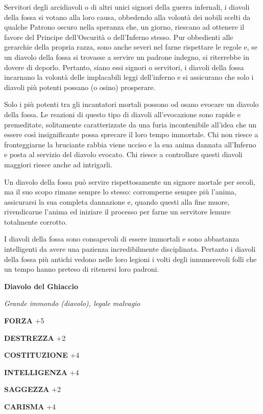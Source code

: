 \begin{multicols}{2}
	Servitori degli arcidiavoli o di altri unici signori della guerra infernali, i diavoli della fossa si votano alla loro causa, obbedendo alla volontà dei nobili scelti da qualche Patrono oscuro nella speranza che, un giorno, riescano ad ottenere il favore del Principe dell'Oscurità o dell'Inferno stesso. Pur obbedienti alle gerarchie della propria razza, sono anche severi nel farne rispettare le regole e, se un diavolo della fossa si trovasse a servire un padrone indegno, si riterrebbe in dovere di deporlo. Pertanto, siano essi signori o servitori, i diavoli della fossa incarnano la volontà delle implacabili leggi dell'inferno e si assicurano che solo i diavoli più potenti possano (o osino) prosperare.

	Solo i più potenti tra gli incantatori mortali possono od osano evocare un diavolo della fossa. Le reazioni di questo tipo di diavoli all'evocazione sono rapide e premeditate, solitamente caratterizzate da una furia incontenibile all'idea che un essere così insignificante possa sprecare il loro tempo immortale. Chi non riesce a fronteggiarne la bruciante rabbia viene ucciso e la sua anima dannata all'Inferno e posta al servizio del diavolo evocato. Chi riesce a controllare questi diavoli maggiori riesce anche ad intrigarli.

	Un diavolo della fossa può servire rispettosamente un signore mortale per secoli, ma il suo scopo rimane sempre lo stesso: corromperne sempre più l'anima, assicurarsi la sua completa dannazione e, quando questi alla fine muore, rivendicarne l'anima ed iniziare il processo per farne un servitore lemure totalmente corrotto.

	I diavoli della fossa sono consapevoli di essere immortali e sono abbastanza intelligenti da avere una pazienza incredibilmente disciplinata. Pertanto i diavoli della fossa più antichi vedono nelle loro legioni i volti degli innumerevoli folli che un tempo hanno preteso di ritenersi loro padroni.


	\medskip{}\textbf{Diavolo del Ghiaccio}

	\textit{Grande immondo (diavolo), legale malvagio}

	\textbf{FORZA} +5

	\textbf{DESTREZZA} +2

	\textbf{COSTITUZIONE} +4

	\textbf{INTELLIGENZA} +4

	\textbf{SAGGEZZA} +2

	\textbf{CARISMA} +4


\end{multicols}
